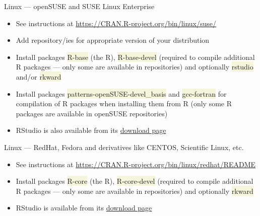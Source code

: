 \documentclass[compress, ucs, xelatex, 11pt, xcolor=svgnames, aspectratio=169,
	hyperref={
		bookmarks=true,
		unicode=true,
		colorlinks=true,
		pdftitle={Molecular data in R},
		plainpages=false,
		pdfauthor={Vojtech Zeisek},
		pdfsubject={Course about phylogeny and evolution in R},
		pdfcreator={XeLaTeX},
		pdfkeywords={R, evolution, phylogeny, molecular data},
		linkcolor=Crimson, %
		anchorcolor=Magenta, %
		citecolor=Magenta, %
		filecolor=Magenta, %
		menucolor=Magenta, %
		urlcolor=DodgerBlue, %
		pdftex},
	url={hyphens, lowtilde} %
	]{beamer}
\renewcommand{\texttt}[1]{\colorbox{Beige}{{\ttfamily #1}}}
\begin{document}
\begin{frame}{Linux --- openSUSE and SUSE Linux Enterprise}
	\begin{itemize}
		\item See instructions at \url{https://CRAN.R-project.org/bin/linux/suse/}
		\item Add repository/ies for appropriate version of your distribution
		\begin{itemize}
		\end{itemize}
		\item Install packages \texttt{R-base} (the R), \texttt{R-base-devel} (required to compile additional R packages --- only some are available in repositories) and optionally \texttt{rstudio} and/or \texttt{rkward}
		\item Install packages \texttt{patterns-openSUSE-devel\_basis} and \texttt{gcc-fortran} for compilation of R packages when installing them from R (only some R packages are available in openSUSE repositories)
		\item RStudio is also available from its \href{https://rstudio.com/products/rstudio/download/\#download}{download page}
	\end{itemize}
\end{frame}

\begin{frame}{Linux --- RedHat, Fedora and derivatives like CENTOS, Scientific Linux, etc.}
	\begin{itemize}
		\item See instructions at \url{https://CRAN.R-project.org/bin/linux/redhat/README}
		\item Install packages \texttt{R-core} (the R), \texttt{R-core-devel} (required to compile additional R packages --- only some are available in repositories) and optionally \texttt{rkward}
		\item RStudio is available from its \href{https://rstudio.com/products/rstudio/download/\#download}{download page}
	\end{itemize}
\end{frame}
\end{document}
